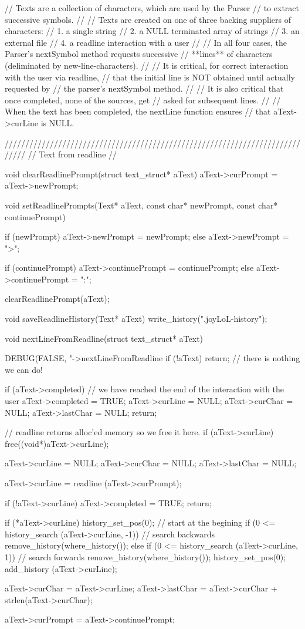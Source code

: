 // Texts are a collection of characters, which are used by the Parser
// to extract successive symbols.
//
// Texts are created on one of three backing suppliers of characters:
// 1. a single string
// 2. a NULL terminated array of strings
// 3. an external file
// 4. a readline interaction with a user
//
// In all four cases, the Parser's nextSymbol method requests successive
// **lines** of characters (deliminated by new-line-characters).
//
// It is critical, for correct interaction with the user via readline,
// that the initial line is NOT obtained until actually requested by
// the parser's nextSymbol method.
//
// It is also critical that once completed, none of the sources, get
// asked for subsequent lines.
//
// When the text has been completed, the nextLine function ensures
// that aText->curLine is NULL.

/////////////////////////////////////////////////////////////////////////////
// Text from readline
//

void clearReadlinePrompt(struct text_struct* aText) {
  aText->curPrompt = aText->newPrompt;
}

void setReadlinePrompts(Text* aText,
                        const char* newPrompt, const char* continuePrompt) {

  if (newPrompt) aText->newPrompt = newPrompt;
  else           aText->newPrompt = ">";

  if (continuePrompt) aText->continuePrompt = continuePrompt;
  else                aText->continuePrompt = ":";

  clearReadlinePrompt(aText);
}

void saveReadlineHistory(Text* aText) {
  write_history(".joyLoL-history");
}

void nextLineFromReadline(struct text_struct* aText) {
  DEBUG(FALSE, "->nextLineFromReadline %
  if (!aText) return; // there is nothing we can do!

  if (aText->completed) {
    // we have reached the end of the interaction with the user
    aText->completed = TRUE;
    aText->curLine   = NULL;
    aText->curChar   = NULL;
    aText->lastChar  = NULL;
    return;
  }

  // readline returns alloc'ed memory so we free it here.
  if (aText->curLine) free((void*)aText->curLine);

  aText->curLine  = NULL;
  aText->curChar  = NULL;
  aText->lastChar = NULL;

  aText->curLine = readline (aText->curPrompt);

  if (!aText->curLine) {
    aText->completed = TRUE;
    return;
  }

  if (*aText->curLine) {
    history_set_pos(0); // start at the begining
    if (0 <= history_search (aText->curLine, -1)) { // search backwards
      remove_history(where_history());
    } else if (0 <= history_search (aText->curLine, 1)) { // search forwards
      remove_history(where_history());
    }
    history_set_pos(0);
    add_history (aText->curLine);
  }

  aText->curChar = aText->curLine;
  aText->lastChar = aText->curChar + strlen(aText->curChar);

  aText->curPrompt = aText->continuePrompt;
}

